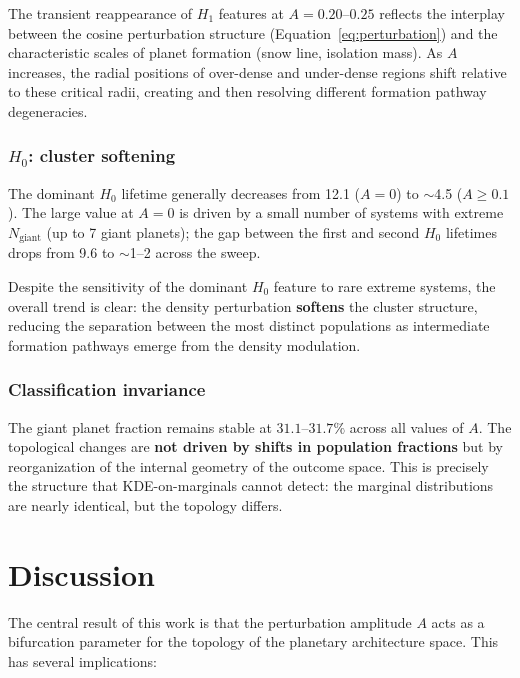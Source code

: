 \documentclass[twocolumn]{aastex631}
\begin{document}
The transient reappearance of $H_1$ features at $A = 0.20$--$0.25$ reflects
the interplay between the cosine perturbation structure
(Equation~\ref{eq:perturbation}) and the characteristic scales of planet
formation (snow line, isolation mass).  As $A$ increases, the radial positions
of over-dense and under-dense regions shift relative to these critical radii,
creating and then resolving different formation pathway degeneracies.

\subsubsection{$H_0$: cluster softening}
\label{sec:h0}

The dominant $H_0$ lifetime generally decreases from 12.1 ($A = 0$) to
$\sim$4.5 ($A \geq 0.1$).  The large value at $A = 0$ is driven by a small
number of systems with extreme $N_\text{giant}$ (up to 7 giant planets); the
gap between the first and second $H_0$ lifetimes drops from 9.6 to $\sim$1--2
across the sweep.

Despite the sensitivity of the dominant $H_0$ feature to rare extreme systems,
the overall trend is clear: the density perturbation \textbf{softens} the
cluster structure, reducing the separation between the most distinct
populations as intermediate formation pathways emerge from the density
modulation.

\subsubsection{Classification invariance}
\label{sec:invariance}

The giant planet fraction remains stable at $31.1$--$31.7\%$ across all
values of $A$.  The topological changes are \textbf{not driven by shifts in
population fractions} but by reorganization of the internal geometry of the
outcome space.  This is precisely the structure that KDE-on-marginals cannot
detect: the marginal distributions are nearly identical, but the topology
differs.

\section{Discussion}
\label{sec:discussion}

The central result of this work is that the perturbation amplitude $A$ acts as
a bifurcation parameter for the topology of the planetary architecture space.
This has several implications:
\end{document}
